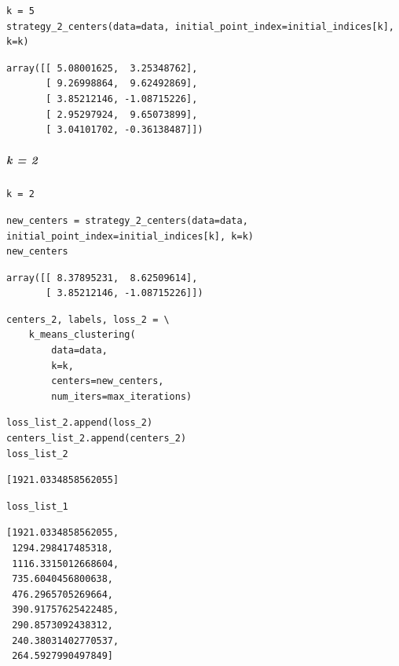 \begin{verbatim}
k = 5
strategy_2_centers(data=data, initial_point_index=initial_indices[k], k=k)
\end{verbatim}

\begin{verbatim}
array([[ 5.08001625,  3.25348762],
       [ 9.26998864,  9.62492869],
       [ 3.85212146, -1.08715226],
       [ 2.95297924,  9.65073899],
       [ 3.04101702, -0.36138487]])
\end{verbatim}

\subparagraph{k = 2}

\begin{verbatim}
k = 2
\end{verbatim}

\begin{verbatim}
new_centers = strategy_2_centers(data=data, initial_point_index=initial_indices[k], k=k)
new_centers
\end{verbatim}

\begin{verbatim}
array([[ 8.37895231,  8.62509614],
       [ 3.85212146, -1.08715226]])
\end{verbatim}

\begin{verbatim}
centers_2, labels, loss_2 = \
    k_means_clustering(
        data=data,
        k=k,
        centers=new_centers,
        num_iters=max_iterations)
\end{verbatim}

\begin{verbatim}
loss_list_2.append(loss_2)
centers_list_2.append(centers_2)
loss_list_2
\end{verbatim}

\begin{verbatim}
[1921.0334858562055]
\end{verbatim}

\begin{verbatim}
loss_list_1
\end{verbatim}

\begin{verbatim}
[1921.0334858562055,
 1294.298417485318,
 1116.3315012668604,
 735.6040456800638,
 476.2965705269664,
 390.91757625422485,
 290.8573092438312,
 240.38031402770537,
 264.5927990497849]
\end{verbatim}

